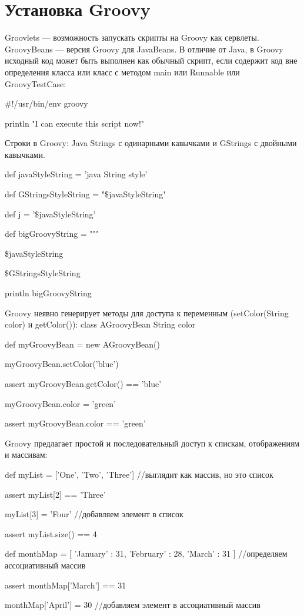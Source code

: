 \documentclass[14pt,article]{scrartcl}
\begin{document}
\section*{Установка Groovy}
Groovlets — возможность запускать скрипты на Groovy как сервлеты.
GroovyBeans — версия Groovy для JavaBeans.
В отличие от Java, в Groovy исходный код может быть выполнен как обычный скрипт, если содержит код вне определения класса или класс с методом main или Runnable или GroovyTestCase:

\#!/usr/bin/env groovy{}

println "I can execute this script now!"{}

Строки в Groovy: Java Strings с одинарными кавычками и GStrings с двойными кавычками.{}

def javaStyleString = 'java String style'{}

def GStringsStyleString = "\${javaStyleString}"{}

def j = '\${javaStyleString}' {}

def bigGroovyString = """{}

    \${javaStyleString}{}

    \${GStringsStyleString}{}

println bigGroovyString{}

Groovy неявно генерирует методы для доступа к переменным (setColor(String color) и getColor()):
class AGroovyBean {
  String color
}

def myGroovyBean = new AGroovyBean(){}

myGroovyBean.setColor('blue'){}

assert myGroovyBean.getColor() == 'blue'{}

myGroovyBean.color = 'green'{}

assert myGroovyBean.color == 'green'{}

Groovy предлагает простой и последовательный доступ к спискам, отображениям и массивам:{}

def myList = ['One', 'Two', 'Three']  //выглядит как массив, но это список{}

assert myList[2] == 'Three'{}

myList[3] = 'Four'  //добавляем элемент в список{}

assert myList.size() == 4{}


def monthMap = [ 'January' : 31, 'February' : 28, 'March' : 31 ]  //определяем ассоциативный массив{}

assert monthMap['March'] == 31  {}

monthMap['April'] = 30  //добавляем элемент в ассоциативный массив{}
\end{document}
